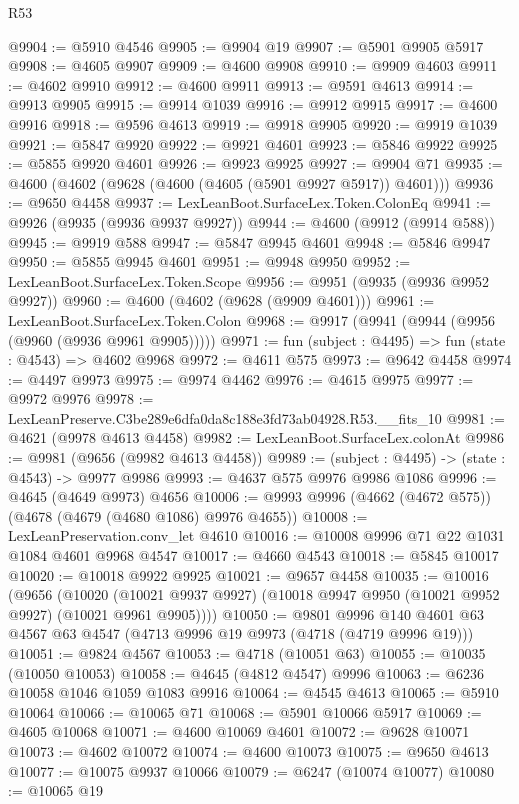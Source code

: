 \begin{lexlean}{R53}
\begin{coremodule}
@9904 := @5910 @4546
@9905 := @9904 @19
@9907 := @5901 @9905 @5917
@9908 := @4605 @9907
@9909 := @4600 @9908
@9910 := @9909 @4603
@9911 := @4602 @9910
@9912 := @4600 @9911
@9913 := @9591 @4613
@9914 := @9913 @9905
@9915 := @9914 @1039
@9916 := @9912 @9915
@9917 := @4600 @9916
@9918 := @9596 @4613
@9919 := @9918 @9905
@9920 := @9919 @1039
@9921 := @5847 @9920
@9922 := @9921 @4601
@9923 := @5846 @9922
@9925 := @5855 @9920 @4601
@9926 := @9923 @9925
@9927 := @9904 @71
@9935 := @4600 (@4602 (@9628 (@4600 (@4605 (@5901 @9927 @5917)) @4601)))
@9936 := @9650 @4458
@9937 := LexLeanBoot.SurfaceLex.Token.ColonEq
@9941 := @9926 (@9935 (@9936 @9937 @9927))
@9944 := @4600 (@9912 (@9914 @588))
@9945 := @9919 @588
@9947 := @5847 @9945 @4601
@9948 := @5846 @9947
@9950 := @5855 @9945 @4601
@9951 := @9948 @9950
@9952 := LexLeanBoot.SurfaceLex.Token.Scope
@9956 := @9951 (@9935 (@9936 @9952 @9927))
@9960 := @4600 (@4602 (@9628 (@9909 @4601)))
@9961 := LexLeanBoot.SurfaceLex.Token.Colon
@9968 := @9917 (@9941 (@9944 (@9956 (@9960 (@9936 @9961 @9905)))))
@9971 := fun (subject : @4495) => fun (state : @4543) => @4602 @9968
@9972 := @4611 @575
@9973 := @9642 @4458
@9974 := @4497 @9973
@9975 := @9974 @4462
@9976 := @4615 @9975
@9977 := @9972 @9976
@9978 := LexLeanPreserve.C3be289e6dfa0da8c188e3fd73ab04928.R53.__fits_10
@9981 := @4621 (@9978 @4613 @4458)
@9982 := LexLeanBoot.SurfaceLex.colonAt
@9986 := @9981 (@9656 (@9982 @4613 @4458))
@9989 := (subject : @4495) -> (state : @4543) -> @9977 @9986
@9993 := @4637 @575 @9976 @9986 @1086
@9996 := @4645 (@4649 @9973) @4656
@10006 := @9993 @9996 (@4662 (@4672 @575)) (@4678 (@4679 (@4680 @1086) @9976 @4655))
@10008 := LexLeanPreservation.conv_let @4610
@10016 := @10008 @9996 @71 @22 @1031 @1084 @4601 @9968 @4547
@10017 := @4660 @4543
@10018 := @5845 @10017
@10020 := @10018 @9922 @9925
@10021 := @9657 @4458
@10035 := @10016
    (@9656
      (@10020 (@10021 @9937 @9927) (@10018 @9947 @9950 (@10021 @9952 @9927) (@10021 @9961 @9905))))
@10050 := @9801
    @9996
    @140
    @4601
    @63
    @4567
    @63
    @4547
    (@4713 @9996 @19 @9973 (@4718 (@4719 @9996 @19)))
@10051 := @9824 @4567
@10053 := @4718 (@10051 @63)
@10055 := @10035 (@10050 @10053)
@10058 := @4645 (@4812 @4547) @9996
@10063 := @6236 @10058 @1046 @1059 @1083 @9916
@10064 := @4545 @4613
@10065 := @5910 @10064
@10066 := @10065 @71
@10068 := @5901 @10066 @5917
@10069 := @4605 @10068
@10071 := @4600 @10069 @4601
@10072 := @9628 @10071
@10073 := @4602 @10072
@10074 := @4600 @10073
@10075 := @9650 @4613
@10077 := @10075 @9937 @10066
@10079 := @6247 (@10074 @10077)
@10080 := @10065 @19

\end{coremodule}
\end{lexlean}
